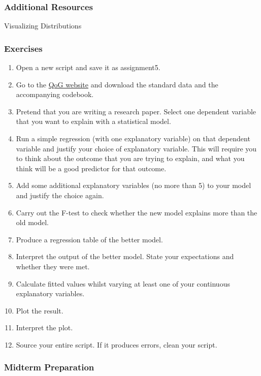 \documentclass[]{article}
\providecommand{\tightlist}{%
  \setlength{\itemsep}{0pt}\setlength{\parskip}{0pt}}
\theoremstyle{definition}
\theoremstyle{definition}
\theoremstyle{definition}
\theoremstyle{remark}
\begin{document}
\subsubsection{Additional Resources}\label{additional-resources-1}

Visualizing Distributions

\subsubsection{Exercises}\label{exercises-6}

\begin{enumerate}
\def\labelenumi{\arabic{enumi}.}
\tightlist
\item
  Open a new script and save it as assignment5.
\item
  Go to the
  \href{http://qog.pol.gu.se/data/datadownloads/qogstandarddata}{QoG
  website} and download the standard data and the accompanying codebook.
\item
  Pretend that you are writing a research paper. Select one dependent
  variable that you want to explain with a statistical model.
\item
  Run a simple regression (with one explanatory variable) on that
  dependent variable and justify your choice of explanatory variable.
  This will require you to think about the outcome that you are trying
  to explain, and what you think will be a good predictor for that
  outcome.
\item
  Add some additional explanatory variables (no more than 5) to your
  model and justify the choice again.
\item
  Carry out the F-test to check whether the new model explains more than
  the old model.
\item
  Produce a regression table of the better model.
\item
  Interpret the output of the better model. State your expectations and
  whether they were met.
\item
  Calculate fitted values whilst varying at least one of your continuous
  explanatory variables.
\item
  Plot the result.
\item
  Interpret the plot.
\item
  Source your entire script. If it produces errors, clean your script.
\end{enumerate}

\subsubsection{Midterm Preparation}\label{midterm-preparation}
\end{document}
